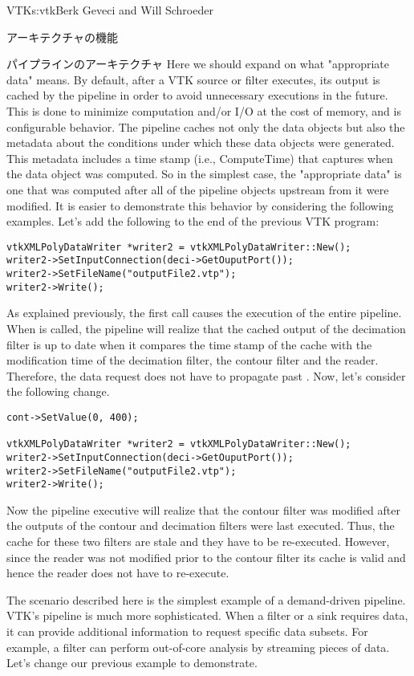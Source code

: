 \begin{aosachapter}{VTK}{s:vtk}{Berk Geveci and Will Schroeder}
\begin{aosasect1}{アーキテクチャの機能}
\begin{aosasect2}{パイプラインのアーキテクチャ}
Here we should expand on what "appropriate data" means. By default,
after a VTK source or filter executes, its output is cached by the
pipeline in order to avoid unnecessary executions in the future. This
is done to minimize computation and/or I/O at the cost of memory, and
is configurable behavior. The pipeline caches not only the data
objects but also the metadata about the conditions under which these
data objects were generated. This metadata includes a time stamp
(i.e., ComputeTime) that captures when the data object was
computed. So in the simplest case, the "appropriate data" is one that
was computed after all of the pipeline objects upstream from it were
modified. It is easier to demonstrate this behavior by considering the
following examples. Let's add the following to the end of the previous
VTK program:

\begin{verbatim}
vtkXMLPolyDataWriter *writer2 = vtkXMLPolyDataWriter::New();
writer2->SetInputConnection(deci->GetOuputPort());
writer2->SetFileName("outputFile2.vtp");
writer2->Write();
\end{verbatim}

As explained previously, the first 
call causes the execution of the entire pipeline. When
 is called, the pipeline will
realize that the cached output of the decimation filter is up to date
when it compares the time stamp of the cache with the modification
time of the decimation filter, the contour filter and the
reader. Therefore, the data request does not have to propagate past
. Now, let's consider the following change.

\begin{verbatim}
cont->SetValue(0, 400);

vtkXMLPolyDataWriter *writer2 = vtkXMLPolyDataWriter::New();
writer2->SetInputConnection(deci->GetOuputPort());
writer2->SetFileName("outputFile2.vtp");
writer2->Write();
\end{verbatim}

Now the pipeline executive will realize that the contour filter was
modified after the outputs of the contour and decimation filters were
last executed. Thus, the cache for these two filters are stale and
they have to be re-executed. However, since the reader was not
modified prior to the contour filter its cache is valid and hence the
reader does not have to re-execute.

The scenario described here is the simplest example of a demand-driven
pipeline. VTK's pipeline is much more sophisticated. When a filter or
a sink requires data, it can provide additional information to request
specific data subsets. For example, a filter can perform out-of-core
analysis by streaming pieces of data. Let's change our previous
example to demonstrate.


\end{aosasect2}
\end{aosasect1}
\end{aosachapter}
